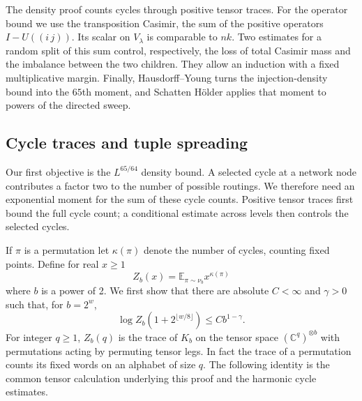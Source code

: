 The density proof counts cycles through positive tensor traces.  For the
operator bound we use the transposition Casimir, the sum of the positive
operators $I-U((i\,j))$.  Its scalar on $V_\lambda$ is comparable to $nk$.
Two estimates for a random split of this sum control, respectively, the
loss of total Casimir mass and the imbalance between the two children.
They allow an induction with a fixed multiplicative margin.  Finally,
Hausdorff--Young turns the injection-density bound into the $65$th moment,
and Schatten H\"older applies that moment to powers of the directed sweep.

\subsection{Cycle traces and tuple spreading}
Our first objective is the $L^{65/64}$ density bound.  A selected cycle at
a network node contributes a factor two to the number of possible
routings.  We therefore need an exponential moment for the sum of these
cycle counts.  Positive tensor traces first bound the full cycle count;
a conditional estimate across levels then controls the selected cycles.

If \(\pi\) is a permutation let \(\kappa(\pi)\) denote the number of cycles, counting fixed points. Define for real \(x\ge 1\)
\[
Z_b(x)=\mathbb E_{\pi\sim\nu_b} x^{\kappa(\pi)}
\]
where \(b\) is a power of 2. We first show that there are absolute \(C<\infty\) and \(\gamma>0\) such that, for \(b=2^w\),
\begin{equation}
\log Z_b(1+2^{\lfloor w/8\rfloor})\le C b^{1-\gamma}.
\label{cas:e1}
\end{equation}
For integer \(q\ge 1\), \(Z_b(q)\) is the trace of \(K_b\) on the tensor space \((\mathbb C^q)^{\otimes b}\) with permutations acting by permuting tensor legs. In fact the trace of a permutation counts its fixed words on an alphabet of size \(q\). The following identity is the common tensor calculation underlying this
proof and the harmonic cycle estimates.

